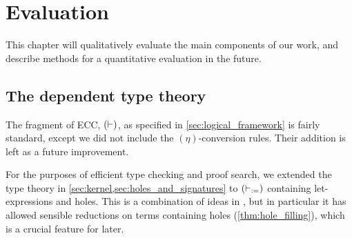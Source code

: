 \documentclass[twoside]{report}
\begin{document}


\chapter{Evaluation}
\label{sec:evaluation}

This chapter will qualitatively evaluate the main components of our work, and describe methods for a quantitative evaluation in the future.

\section{The dependent type theory}
\label{sec:evaluation_type_theory}

The fragment of ECC, $(\vdash)$, as specified in \cref{sec:logical_framework} is fairly standard, except we did not include the $(\eta)$-conversion rules. Their addition is left as a future improvement.

For the purposes of efficient type checking and proof search, we extended the type theory in \cref{sec:kernel,sec:holes_and_signatures} to $(\vdash_{:=})$ containing let-expressions and holes. This is a combination of ideas in \cite{severi1994pure,mcbride2000dependently,norell2007towards}, but in particular it has allowed sensible reductions on terms containing holes (\cref{thm:hole_filling}), which is a crucial feature for later.
\end{document}

